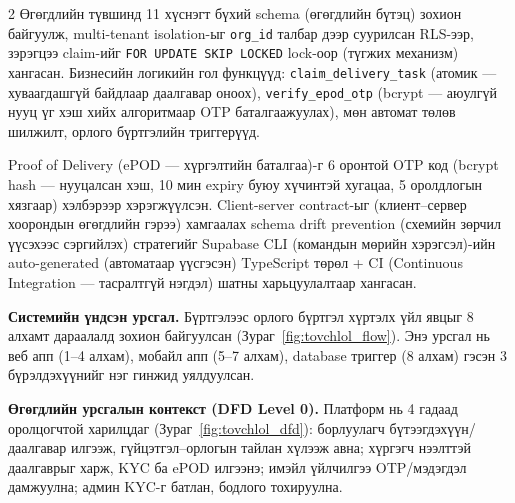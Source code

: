 \begin{multicols}{2}
Өгөгдлийн түвшинд 11 хүснэгт бүхий schema (өгөгдлийн бүтэц) зохион байгуулж, multi-tenant isolation-ыг \texttt{org\_id} талбар дээр суурилсан RLS-ээр, зэрэгцээ claim-ийг \texttt{FOR UPDATE SKIP LOCKED} lock-оор (түгжих механизм) хангасан. Бизнесийн логикийн гол функцүүд: \texttt{claim\_delivery\_task} (атомик --- хуваагдашгүй байдлаар даалгавар оноох), \texttt{verify\_epod\_otp} (bcrypt --- аюулгүй нууц үг хэш хийх алгоритмаар OTP баталгаажуулах), мөн автомат төлөв шилжилт, орлого бүртгэлийн триггерүүд.

Proof of Delivery (ePOD --- хүргэлтийн баталгаа)-г 6 оронтой OTP код (bcrypt hash --- нууцалсан хэш, 10 мин expiry буюу хүчинтэй хугацаа, 5 оролдлогын хязгаар) хэлбэрээр хэрэгжүүлсэн. Client-server contract-ыг (клиент–сервер хоорондын өгөгдлийн гэрээ) хамгаалах schema drift prevention (схемийн зөрчил үүсэхээс сэргийлэх) стратегийг Supabase CLI (командын мөрийн хэрэгсэл)-ийн auto-generated (автоматаар үүсгэсэн) TypeScript төрөл + CI (Continuous Integration --- тасралтгүй нэгдэл) шатны харьцуулалтаар хангасан.

\textbf{Системийн үндсэн урсгал.} Бүртгэлээс орлого бүртгэл хүртэлх үйл явцыг 8 алхамт дараалалд зохион байгуулсан (Зураг~\ref{fig:tovchlol_flow}). Энэ урсгал нь веб апп (1–4 алхам), мобайл апп (5–7 алхам), database триггер (8 алхам) гэсэн 3 бүрэлдэхүүнийг нэг гинжид уялдуулсан.

\textbf{Өгөгдлийн урсгалын контекст (DFD Level 0).} Платформ нь 4 гадаад оролцогчтой харилцдаг (Зураг~\ref{fig:tovchlol_dfd}): борлуулагч бүтээгдэхүүн/даалгавар илгээж, гүйцэтгэл–орлогын тайлан хүлээж авна; хүргэгч нээлттэй даалгаврыг харж, KYC ба ePOD илгээнэ; имэйл үйлчилгээ OTP/мэдэгдэл дамжуулна; админ KYC-г батлан, бодлого тохируулна.

\begin{figure}[H]
\centering
{}
\end{figure}
\end{multicols}
